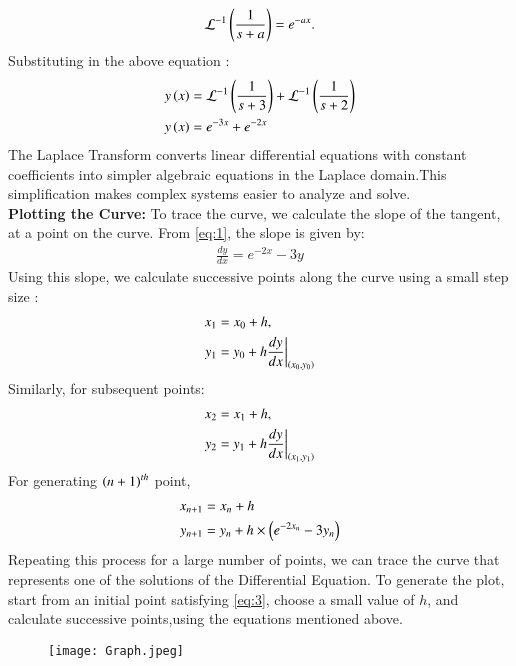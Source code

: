 \documentclass[journal,12pt,onecolumn]{IEEEtran}
\theoremstyle{remark}
\begin{document}
\begin{align}
    \mathcal{L}^{-1}\left(\frac{1}{s + a}\right) = e^{-ax}.
\end{align}
Substituting in the above equation  :
\begin{align}
y\left(x\right) &= \mathcal{L}^{-1}\left(\frac{1}{s + 3}\right) + \mathcal{L}^{-1}\left(\frac{1}{s + 2}\right)\\
y\left(x\right) &= e^{-3x} + e^{-2x}
\end{align}
The Laplace Transform converts linear differential equations with constant coefficients into simpler algebraic equations in the Laplace domain.This simplification makes complex systems easier to analyze and solve.\\
\textbf{Plotting the Curve:}
To trace the curve, we calculate the slope of the tangent, at a point  on the curve. From \eqref{eq:1}, the slope is given by:
\begin{align}
\frac{dy}{dx} = e^{-2x} - 3y
\end{align}
Using this slope, we calculate successive points along the curve using a small step size :
\begin{align}
x_1 &= x_0 + h, \\
y_1 &= y_0 + h \frac{dy}{dx}\bigg|_{\left(x_0, y_0\right)}
\end{align}
Similarly, for subsequent points:
\begin{align}
x_2 &= x_1 + h, \\
y_2 &= y_1 + h \frac{dy}{dx}\bigg|_{\left(x_1, y_1\right)}
\end{align}
For generating $\left(n+1\right)^{th}$ point, 
\begin{align}
    x_{n+1}&=x_n + h\\
    y_{n+1}&=y_n + h\times\left(e^{-2x_n} - 3y_n\right) 
\end{align}
Repeating this process for a large number of points, we can trace the curve that represents one of the solutions of the Differential Equation.
To generate the plot, start from an initial point  satisfying \eqref{eq:3}, choose a small value of $h$, and calculate successive points,using the equations mentioned above.

\begin{figure}[h]
    \centering
    \texttt{[image: Graph.jpeg]}
    \label{fig:example}
\end{figure}



   
\end{document}
